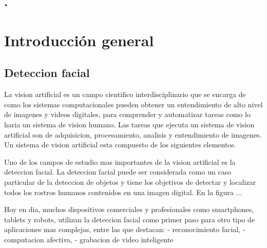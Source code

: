 \texttt{•}%

\chapter{Introducción general} %

\label{Chapter1} %
\label{IntroGeneral}


\newcommand{\keyword}[1]{\textbf{#1}}
\newcommand{\tabhead}[1]{\textbf{#1}}
\newcommand{\code}[1]{\texttt{#1}}
\newcommand{\file}[1]{\texttt{\bfseries#1}}
\newcommand{\option}[1]{\texttt{\itshape#1}}
\newcommand{\grados}{$^{\circ}$}



\section{Deteccion facial}
La vision artificial es un campo cientifico interdisciplinario que se encarga de como los sistemas computacionales pueden obtener un entendimiento de alto nivel de imagenes y videos digitales, para comprender y automatizar tareas como lo haria un sistema de vision humano. Las tareas que ejecuta un sistema de vision artificial son de adquisicion, procesamiento, analisis y entendimiento de imagenes. Un sistema de vision artificial esta compuesto de los siguientes elementos.


Uno de los campos de estudio mas importantes de la vision artificial es la deteccion facial. La deteccion facial puede ser considerada como un caso particular de la deteccion de objetos y tiene los objetivos de detectar y localizar todos los rostros humanos contenidos en una imagen digital. En la figura ...


Hoy en dia, muchos dispositivos comerciales y profesionales como smartphones, tablets y robots, utilizan la deteccion facial como primer paso para otro tipo de aplicaciones mas complejas, entre las que destacan:
- reconocimiento facial,
- computacion afectiva,
- grabacion de video inteligente


